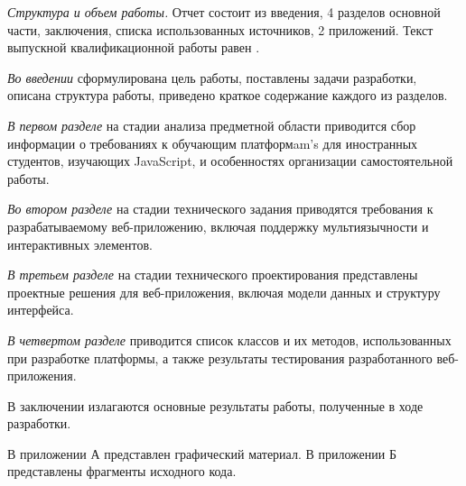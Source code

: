 \emph{Структура и объем работы.} Отчет состоит из введения, 4 разделов основной части, заключения, списка использованных источников, 2 приложений. Текст выпускной квалификационной работы равен .

\emph{Во введении} сформулирована цель работы, поставлены задачи разработки, описана структура работы, приведено краткое содержание каждого из разделов.

\emph{В первом разделе} на стадии анализа предметной области приводится сбор информации о требованиях к обучающим платформam's для иностранных студентов, изучающих JavaScript, и особенностях организации самостоятельной работы.

\emph{Во втором разделе} на стадии технического задания приводятся требования к разрабатываемому веб-приложению, включая поддержку мультиязычности и интерактивных элементов.

\emph{В третьем разделе} на стадии технического проектирования представлены проектные решения для веб-приложения, включая модели данных и структуру интерфейса.

\emph{В четвертом разделе} приводится список классов и их методов, использованных при разработке платформы, а также результаты тестирования разработанного веб-приложения.

В заключении излагаются основные результаты работы, полученные в ходе разработки.

В приложении А представлен графический материал.
В приложении Б представлены фрагменты исходного кода. 
